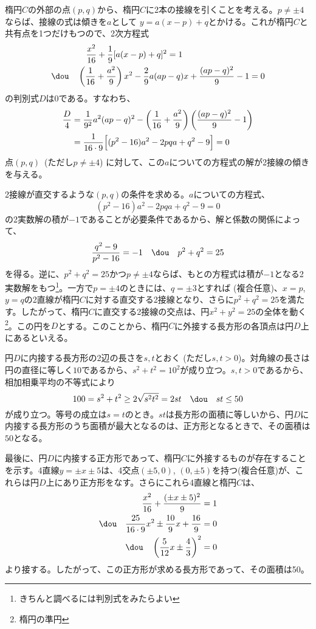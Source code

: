 楕円$C$の外部の点$(p, q)$から、楕円$C$に2本の接線を引くことを考える。$p\neq\pm 4$ならば、接線の式は傾きを$a$として $y=a(x-p)+q$とかける。これが楕円$C$と共有点を1つだけもつので、2次方程式
\begin{align*}
 &\quad\frac{x^2}{16}+\frac{1}{9}[a(x-p)+q]^2=1 \\
 \dou\quad &\left(\frac{1}{16}+\frac{a^2}{9}\right)x^2-\frac{2}{9}a(ap-q)x+\frac{(ap-q)^2}{9}-1=0
\end{align*}
の判別式$D$は0である。すなわち、
\begin{align*}
 \frac{D}{4}&=\frac{1}{9^2}a^2(ap-q)^2-\left(\frac{1}{16}+\frac{a^2}{9}\right)\left(\frac{(ap-q)^2}{9}-1\right) \\
 &=\frac{1}{16\cdot9}\Bigl[(p^2-16)a^2-2pqa+q^2-9\Bigr]=0
\end{align*}
点$(p, q)$~(ただし$p\neq\pm 4$) に対して、この$a$についての方程式の解が2接線の傾きを与える。

2接線が直交するような$(p, q)$の条件を求める。$a$についての方程式、
\[ (p^2-16)a^2-2pqa+q^2-9=0 \]
の2実数解の積が$-1$であることが必要条件であるから、解と係数の関係によって、
\[ \frac{q^2-9}{p^2-16}=-1 \quad\dou\quad p^2+q^2=25 \]
を得る。逆に、$p^2+q^2=25$かつ$p\neq\pm 4$ならば、もとの方程式は積が$-1$となる2実数解をもつ\footnote{きちんと調べるには判別式をみたらよい}。一方で$p=\pm 4$のときには、$q=\pm 3$とすれば (複合任意)、$x=p$, $y=q$の2直線が楕円$C$に対する直交する2接線となり、さらに$p^2+q^2=25$を満たす。したがって、楕円$C$に直交する2接線の交点は、円$x^2+y^2=25$の全体を動く\footnote{楕円の準円}。この円を$D$とする。このことから、楕円$C$に外接する長方形の各頂点は円$D$上にあるといえる。

円$D$に内接する長方形の2辺の長さを$s, t$とおく (ただし$s, t>0$)。対角線の長さは円の直径に等しく$10$であるから、$s^2+t^2=10^2$が成り立つ。$s, t>0$であるから、相加相乗平均の不等式により
\[ 100=s^2+t^2\ge 2\sqrt{s^2t^2}=2st \quad\dou\quad st\le 50 \]
が成り立つ。等号の成立は$s=t$のとき。$st$は長方形の面積に等しいから、円$D$に内接する長方形のうち面積が最大となるのは、正方形となるときで、その面積は$50$となる。

最後に、円$D$に内接する正方形であって、楕円$C$に外接するものが存在することを示す。4直線$y=\pm x\pm5$は、4交点$(\pm5, 0)$, $(0, \pm5)$を持つ(複合任意)が、これらは円$D$上にあり正方形をなす。さらにこれら4直線と楕円$C$は、
\begin{align*}
 \frac{x^2}{16}+\frac{(\pm x\pm 5)^2}{9}&=1 \\
 \dou\quad \frac{25}{16\cdot 9}x^2\pm \frac{10}{9}x+\frac{16}{9}&=0 \\
 \dou\quad \left(\frac{5}{12}x \pm \frac{4}{3}\right)^2&=0 \\
\end{align*}
より接する。したがって、この正方形が求める長方形であって、その面積は50。